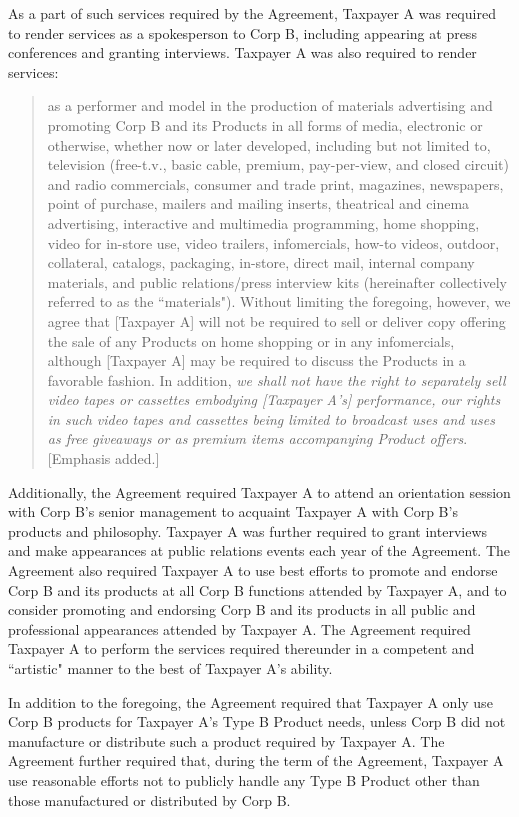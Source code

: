 \begin{select}
As a part of such services required by the Agreement, Taxpayer A was
required to render services as a spokesperson to Corp B, including appearing at
press conferences and granting interviews. Taxpayer A was also required to render
services:
\begin{quotation}
as a performer and model in the production of materials advertising and
promoting Corp B and its Products in all forms of media, electronic or
otherwise, whether now or later developed, including but not limited to,
television (free-t.v., basic cable, premium, pay-per-view, and closed circuit)
and radio commercials, consumer and trade print, magazines, newspapers,
point of purchase, mailers and mailing inserts, theatrical and cinema
advertising, interactive and multimedia programming, home shopping, video
for in-store use, video trailers, infomercials, how-to videos, outdoor,
collateral, catalogs, packaging, in-store, direct mail, internal company
materials, and public relations/press interview kits (hereinafter collectively
referred to as the ``materials"). Without limiting the foregoing, however, we
agree that [Taxpayer A] will not be required to sell or deliver copy offering the
sale of any Products on home shopping or in any infomercials, although
[Taxpayer A] may be required to discuss the Products in a favorable fashion. 
In addition, \emph{we shall not have the right to separately sell video tapes or
cassettes embodying [Taxpayer A's] performance, our rights in such video
tapes and cassettes being limited to broadcast uses and uses as free
giveaways or as premium items accompanying Product offers}. [Emphasis
added.]
\end{quotation}
Additionally, the Agreement required Taxpayer A to attend an orientation
session with Corp B's senior management to acquaint Taxpayer A with Corp B's
products and philosophy. Taxpayer A was further required to grant interviews and
make appearances at public relations events each year of the Agreement. The
Agreement also required Taxpayer A to use best efforts to promote and endorse
Corp B and its products at all Corp B functions attended by Taxpayer A, and to
consider promoting and endorsing Corp B and its products in all public and
professional appearances attended by Taxpayer A. The Agreement required
Taxpayer A to perform the services required thereunder in a competent and
``artistic" manner to the best of Taxpayer A's ability. 

In addition to the foregoing, the Agreement required that Taxpayer A only
use Corp B products for Taxpayer A's Type B Product needs, unless Corp B did not
manufacture or distribute such a product required by Taxpayer A. The Agreement
further required that, during the term of the Agreement, Taxpayer A use reasonable 
efforts not to publicly handle any Type B Product other than those manufactured or
distributed by Corp B.


\end{select}
